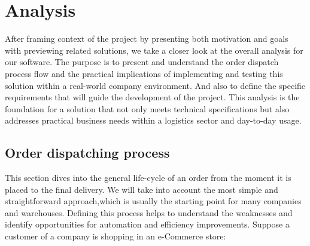 \chapter{Analysis}
\label{chap:analysis}
After framing context of the project by presenting both motivation and goals with previewing related solutions, we take a closer look at the overall analysis for our software.
The purpose is to present and understand the order dispatch process flow and the practical implications of implementing and testing this solution within a real-world company environment.
And also to define the specific requirements that will guide the development of the project.
This analysis is the foundation for a solution that not only meets technical specifications but also addresses practical business needs within a logistics sector and day-to-day usage.


\section{Order dispatching process}
\label{sec:order-dispatching-process}
This section dives into the general life-cycle of an order from the moment it is placed to the final delivery.
We will take into account the most simple and straightforward approach,which is usually the starting point for many companies and warehouses.
Defining this process helps to understand the weaknesses and identify opportunities for automation and efficiency improvements.
Suppose a customer of a company is shopping in an e-Commerce store:

